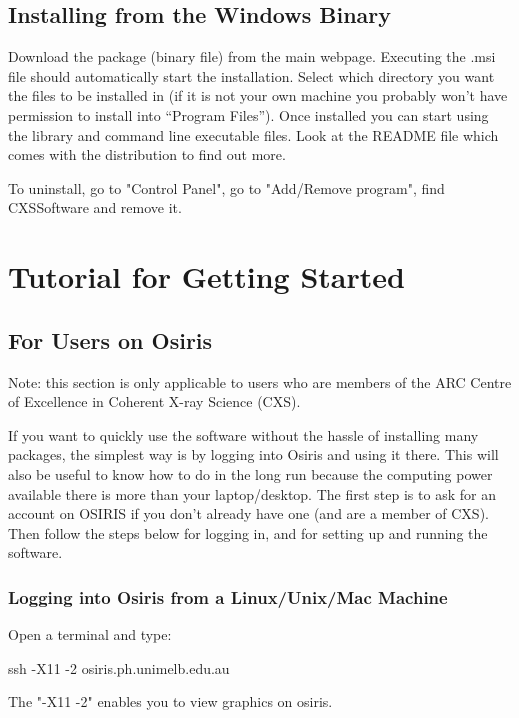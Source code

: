 \documentclass[]{cxs-software}
\begin{document}
\subsection{Installing from the Windows Binary}

Download the package (binary file) from the main webpage. Executing
the .msi file should automatically start the installation. Select
which directory you want the files to be installed in (if it is not
your own machine you probably won't have permission to install into
``Program Files''). Once installed you can start using the library and
command line executable files. Look at the README file which comes
with the distribution to find out more. 

To uninstall, go to "Control Panel", go to "Add/Remove program", find
CXSSoftware and remove it.


\newpage

\section{Tutorial for Getting Started}
\label{getting started}

\subsection{For Users on Osiris}

Note: this section is only applicable to users who are members of
the ARC Centre of Excellence in Coherent X-ray Science (CXS).

If you want to quickly use the software without the hassle of
installing many packages, the simplest way is by logging into Osiris
and using it there. This will also be useful to know how to do in the
long run because the computing power available there is more than your
laptop/desktop. The first step is to ask for an account on OSIRIS if
you don't already have one (and are a member of CXS). Then follow the
steps below for logging in, and for setting up and running the
software.

\subsubsection{Logging into Osiris from a Linux/Unix/Mac Machine}

Open a terminal and type: 
\begin{myverbatim}
  ssh -X11 -2 osiris.ph.unimelb.edu.au 
\end{myverbatim}
The "-X11 -2" enables you to view graphics on osiris.
\end{document}
